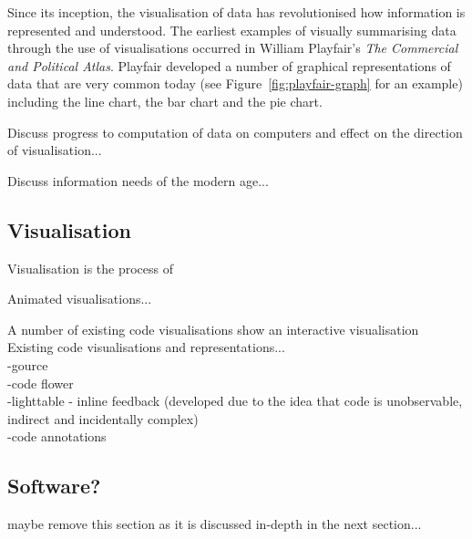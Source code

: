 Since its inception, the visualisation of data has revolutionised how information is represented and understood. The earliest examples of visually summarising data through the use of visualisations occurred in William Playfair's \textit{The Commercial and Political Atlas}. Playfair developed a number of graphical representations of data that are very common today (see Figure~\ref{fig:playfair-graph} for an example) including the line chart, the bar chart and the pie chart.

Discuss progress to computation of data on computers and effect on the direction of visualisation...

Discuss information needs of the modern age...

\subsection{Visualisation}

Visualisation is the process of 

Animated visualisations...

A number of existing code visualisations show an interactive visualisation Existing code visualisations and representations...\\
-gource~\cite{Caudwell2010}\\
-code flower\\
-lighttable - inline feedback (developed due to the idea that code is unobservable, indirect and incidentally complex) \\
-code annotations~\cite{Swift2013}

\subsection{Software?}
{\color{red} maybe remove this section as it is discussed in-depth in the next section...}





